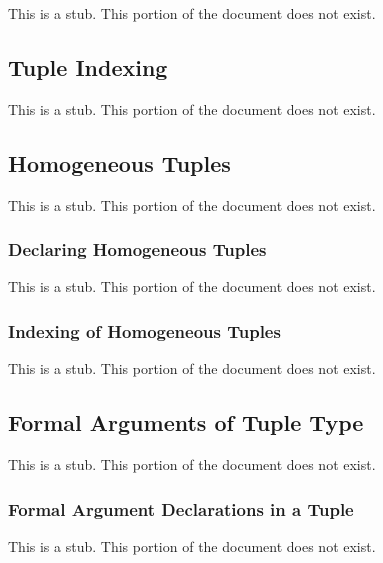 This is a stub.  This portion of the document does not exist.

\subsection{Tuple Indexing}
\label{Tuple_Indexing}

This is a stub.  This portion of the document does not exist.

\subsection{Homogeneous Tuples}
\label{Homogeneous_Tuples}

This is a stub.  This portion of the document does not exist.

\subsubsection{Declaring Homogeneous Tuples}
\label{Declaring_Homogeneous_Tuples}

This is a stub.  This portion of the document does not exist.

\subsubsection{Indexing of Homogeneous Tuples}
\label{Indexing_of_Homogeneous_Tuples}

This is a stub.  This portion of the document does not exist.

\subsection{Formal Arguments of Tuple Type}
\label{Formal_Arguments_of_Tuple_Type}

This is a stub.  This portion of the document does not exist.

\subsubsection{Formal Argument Declarations in a Tuple}
\label{Formal_Argument_Declarations_in_a_Tuple}

This is a stub.  This portion of the document does not exist.
